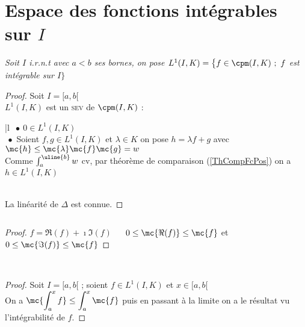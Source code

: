 	\section{Espace des fonctions intégrables sur $I$}
		\textit{Soit $I$ i.r.n.t avec $a<b$ ses bornes, on pose $L^1(I,K) = \big\{f\in\cpm(I,K) ~;~f$ est intégrable sur $I \big\}$}
		\vspace*{0.5cm} \\ 
		\begin{proof} Soit $I=[a,b[$ \vspace*{0.2cm}\\
		$L^1(I,K)$ est un \textsc{sev} de $\cpm(I,K)$ : \\ \hspace*{0.5cm}\begin{blockarray}{|l}
		$~\bullet ~0\in L^1(I,K)$ \\ $~\bullet$ Soient $f,g\in L^1(I,K)$ et $\lambda\in K$ on pose $h=\lambda f+g$ avec 
		$\mc{h}\leq \mc{\lambda}\mc{f}\mc{g} = w$ \\ Comme $\int_a^{\uline{b}} w$ cv, par théorème de comparaison (\ref{ThCompFcPos}) on a 
		$h\in L^1(I,K)$  \end{blockarray} \vspace*{0.2cm}\\
		La linéarité de $\Delta$ est connue.
		\end{proof}
		${}$ \\ 
		\begin{proof}
		\fbox{$\Leftarrow$} $f=\Re(f)+\imath \Im(f)$ $~~~~$ \fbox{$\Rightarrow$} $0\leq\mc{\Re(f)} \leq \mc{f}$ et $0\leq\mc{\Im(f)}\leq\mc{f}$
		\end{proof}
		${}$ \\ 
		\vspace*{0.5cm} \\ 
		\begin{proof}
		Soit $I=[a,b[$ ; soient $f\in L^1(I,K)$ et $x\in [a,b[$\\
		On a $\displaystyle{\mc{\int_a^x f} \leq \int_a^x \mc{f}}$ puis en passant à la limite on a le résultat vu l'intégrabilité de $f$.
		\end{proof}
